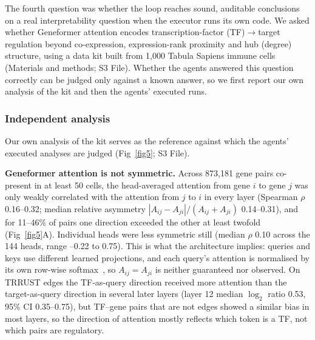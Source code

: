 The fourth question was whether the loop reaches sound, auditable conclusions on a real interpretability question when the executor runs its own code. We asked whether Geneformer attention encodes transcription-factor (TF)$\to$target regulation beyond co-expression, expression-rank proximity and hub (degree) structure, using a data kit built from 1,000 Tabula Sapiens immune cells (Materials and methods; S3 File). Whether the agents answered this question correctly can be judged only against a known answer, so we first report our own analysis of the kit and then the agents' executed runs.

\subsubsection*{Independent analysis}

Our own analysis of the kit serves as the reference against which the agents' executed analyses are judged (Fig~\ref{fig5}; S3 File).

\textbf{Geneformer attention is not symmetric.} Across 873,181 gene pairs co-present in at least 50 cells, the head-averaged attention from gene $i$ to gene $j$ was only weakly correlated with the attention from $j$ to $i$ in every layer (Spearman $\rho$ 0.16--0.32; median relative asymmetry $|A_{ij}-A_{ji}|/(A_{ij}+A_{ji})$ 0.14--0.31), and for 11--46\% of pairs one direction exceeded the other at least twofold (Fig~\ref{fig5}A). Individual heads were less symmetric still (median $\rho$ 0.10 across the 144 heads, range --0.22 to 0.75). This is what the architecture implies: queries and keys use different learned projections, and each query's attention is normalised by its own row-wise softmax~\cite{vaswani2017attention,tsai2019dissection}, so $A_{ij}=A_{ji}$ is neither guaranteed nor observed. On TRRUST edges the TF-as-query direction received more attention than the target-as-query direction in several later layers (layer 12 median $\log_2$ ratio 0.53, 95\% CI 0.35--0.75), but TF--gene pairs that are not edges showed a similar bias in most layers, so the direction of attention mostly reflects which token is a TF, not which pairs are regulatory.

